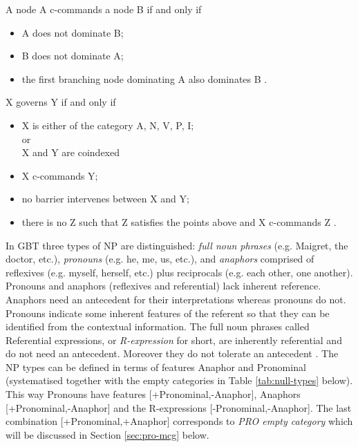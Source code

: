     \begin{definition}[c-command]\label{def:c-command}
        A node A c-commands a node B if and only if
        \begin{itemize}
            \item A does not dominate B;
            \item B does not dominate A;
            \item the first branching node dominating A also dominates B \citep[212]{Haegeman1991}.
        \end{itemize}
    \end{definition}
    
    \begin{definition}[Government]\label{def:government1}
        X governs Y if and only if
        \begin{itemize}
            \item X is either of the category A, N, V, P, I; \\
                or \\
                X and Y are coindexed
            \item X c-commands Y;
            \item no barrier intervenes between X and Y;
            \item there is no Z such that Z satisfies the points above and X c-commands Z \citep[557]{Haegeman1991}.
        \end{itemize}
    \end{definition}

    In GBT three types of NP are distinguished: \textit{full noun phrases} (e.g. Maigret, the doctor,  etc.), \textit{pronouns} (e.g. he, me, us, etc.), and \textit{anaphors} comprised of reflexives (e.g. myself, herself, etc.) plus reciprocals (e.g. each other, one another). Pronouns and anaphors (reflexives and referential) lack inherent reference. Anaphors need an antecedent for their interpretations whereas pronouns do not. Pronouns indicate some inherent features of the referent so that they can be identified from the contextual information. The full noun phrases called Referential expressions, or \textit{R-expression} for short, are inherently referential and do not need an antecedent. Moreover they do not tolerate an antecedent \citep[226]{Haegeman1991}. The NP types can be defined in terms of features Anaphor and Pronominal (systematised together with the empty categories in Table \ref{tab:null-types} below). This way Pronouns have features [+Pronominal,-Anaphor], Anaphors [+Pronominal,-Anaphor] and the R-expressions [-Pronominal,-Anaphor]. The last combination [+Pronominal,+Anaphor] corresponds to \textit{PRO empty category} which will be discussed in Section \ref{sec:pro-mcg} below. 

